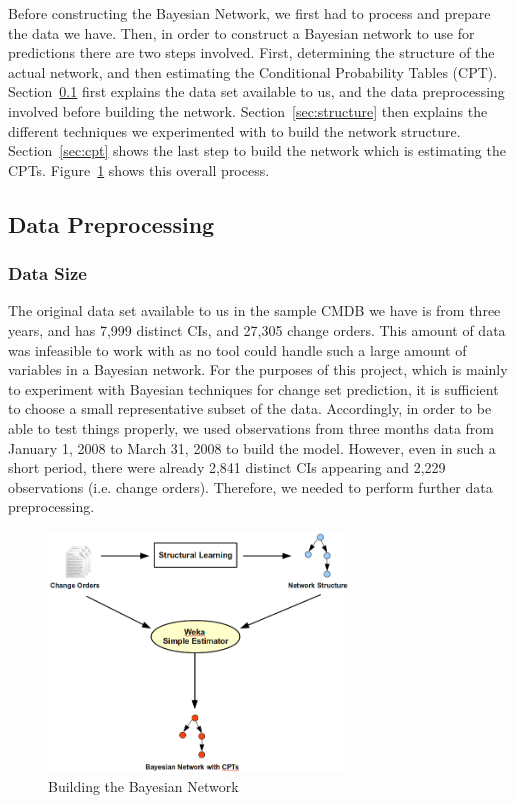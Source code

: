 \documentclass{article}
\begin{document}
Before constructing the Bayesian Network, we first had to process and prepare the data we have. Then, in order to construct a Bayesian network to use for
predictions there are two steps involved. First, determining the structure of the actual network, and then estimating the Conditional Probability Tables
(CPT). Section~\ref{sec:data} first explains the data set available to us, and the data preprocessing involved before building the network.
Section~\ref{sec:structure} then explains the different techniques we experimented with to build the network structure. Section~\ref{sec:cpt} shows the last
step to build the network which is estimating the CPTs. Figure~\ref{fig:process} shows this overall process.

\subsection{Data Preprocessing}
\label{sec:data}

\subsubsection*{Data Size}
The original data set available to us in the sample CMDB we have is from three years, and has 7,999 distinct CIs, and 27,305 change orders. This amount of data
was infeasible to work with as no tool could handle such a large amount of variables in a Bayesian network. For the purposes of this project, which is mainly to
experiment with Bayesian techniques for change set prediction, it is sufficient to choose a small representative subset of the data. Accordingly, in order to be
able to test things properly, we used observations from three months data from January 1, 2008 to March 31, 2008 to build the model. However, even in such a
short period, there were already 2,841 distinct CIs appearing and 2,229 observations (i.e. change orders). Therefore, we needed to perform further data
preprocessing. 

\begin{figure}[!t]
\centering
\includegraphics[width=8cm]{graphics/constructingmodel.png}
\caption{Building the Bayesian Network}
\label{fig:process}
\end{figure}
\end{document}
